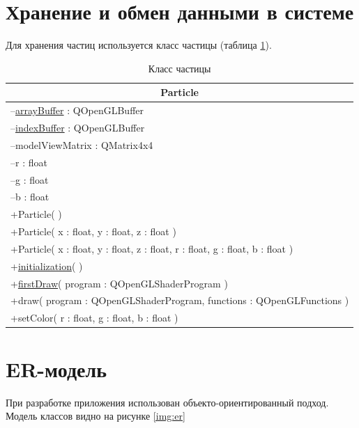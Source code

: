 \section{Хранение и обмен данными в системе}

Для хранения частиц используется класс частицы (таблица \ref{table:particle}).

\begin{table}[H]
    \centering
    \caption{Класс частицы}
    \label{table:particle}
    \begin{tabular}{|l|}
        \hline
        \multicolumn{1}{|c|}{\textbf{Particle}} \\
        \hline
        --\underline{arrayBuffer} : QOpenGLBuffer \\
        --\underline{indexBuffer} : QOpenGLBuffer \\
        --modelViewMatrix : QMatrix4x4 \\
        --r : float \\
        --g : float \\
        --b : float \\
        \hline
        +Particle( ) \\
        +Particle( x : float, y : float, z : float ) \\
        +Particle( x : float, y : float, z : float, r : float, g : float, b : float ) \\
        +\underline{initialization}( ) \\
        +\underline{firstDraw}( program : QOpenGLShaderProgram ) \\
        +draw( program : QOpenGLShaderProgram, functions : QOpenGLFunctions ) \\
        +setColor( r : float, g : float, b : float ) \\
        \hline
    \end{tabular}
\end{table}

\section{ER-модель}

При разработке приложения использован объекто-ориентированный подход. Модель классов
видно на рисунке \ref{img:er}

